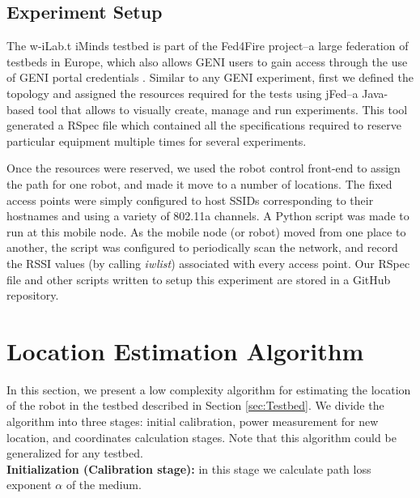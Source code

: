 \documentclass[journal]{IEEEtran} 				\IEEEoverridecommandlockouts 						\usepackage{amsmath,amssymb}
\begin{document}
\subsection{Experiment Setup}\label{sec:Testbed:B}

The w-iLab.t iMinds testbed is part of the Fed4Fire project--a large federation of testbeds in Europe, which also allows GENI users to gain access through the use of GENI portal credentials \cite{geni}. Similar to any GENI experiment, first we defined the topology and assigned the resources required for the tests using jFed--a Java-based tool that allows to visually create, manage and run experiments. This tool generated a RSpec file which contained all the specifications required to reserve particular equipment multiple times for several experiments.

Once the resources were reserved, we used the robot control front-end to assign the path for one robot, and made it move to a number of locations. The fixed access points were simply configured to host SSIDs corresponding to their hostnames and using a variety of 802.11a channels. A Python script was made to run at this mobile node. As the mobile node (or robot) moved from one place to another, the script was  configured to periodically scan the network, and record the RSSI values (by calling \textit{iwlist}) associated with every access point. Our RSpec file and other scripts written to setup this experiment are stored in a GitHub repository. 


\section{Location Estimation Algorithm}\label{sec:Algorithm}
In this section, we present a low complexity algorithm for estimating the location of the robot in the testbed described in Section \ref{sec:Testbed}. We divide the algorithm into three stages: initial calibration, power measurement for new location, and coordinates calculation stages. Note that this algorithm could be generalized for any testbed.\\
\textbf{Initialization (Calibration stage):} in this stage we calculate path loss exponent $\alpha$ of the medium.
\end{document}
